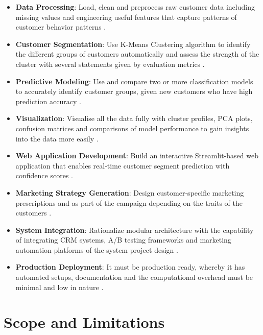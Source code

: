 \documentclass[12pt,a4paper]{report}
\begin{document}
\begin{itemize}
    \item \textbf{Data Processing}: Load, clean and preprocess raw customer data including missing values and engineering useful features that capture patterns of customer behavior patterns  \cite{blattberg2008}.
    
    \item \textbf{Customer Segmentation}: Use K-Means Clustering algorithm to identify the different groups of customers automatically and assess the strength of the cluster with several statements given by evaluation metrics \cite{macqueen1967, rousseeuw1987}.
    
    \item \textbf{Predictive Modeling}: Use and compare two or more classification models to accurately identify customer groups, given new customers who have high prediction accuracy \cite{hastie2009}.
    
    \item \textbf{Visualization}: Visualise all the data fully with cluster profiles, PCA plots, confusion matrices and comparisons of model performance to gain insights into the data more easily \cite{rousseeuw1987}.
    
    \item \textbf{Web Application Development}: Build an interactive Streamlit-based web application that enables real-time customer segment prediction with confidence scores \cite{streamlit2019}.
    
    \item \textbf{Marketing Strategy Generation}: Design customer-specific marketing prescriptions and as part of the campaign depending on the traits of the customers \cite{kotler2016}.
    
    \item \textbf{System Integration}: Rationalize modular architecture with the capability of integrating CRM systems, A/B testing frameworks and marketing automation platforms of the system project design \cite{payne2005, kohavi2009}.
    
    \item \textbf{Production Deployment}: It must be production ready, whereby it has automated setups, documentation and the computational overhead must be minimal and low in nature \cite{merkel2014}.
\end{itemize}


\section{Scope and Limitations}
\end{document}
